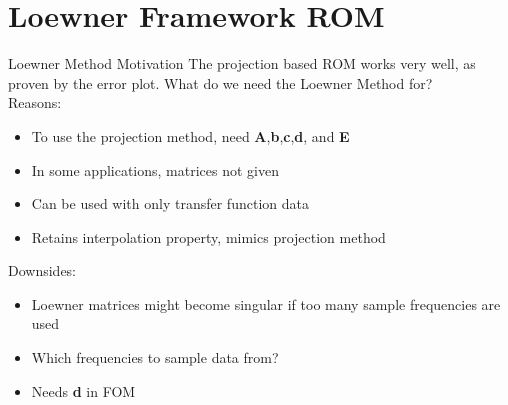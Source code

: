 \section{Loewner Framework ROM}

\begin{frame}{Loewner Method Motivation}
The projection based ROM works very well, as proven by the error plot. What do we need the Loewner Method for?\\
\bigskip
Reasons:
\begin{itemize}
    \item To use the projection method, need {\bf A},{\bf b},{\bf c},{\bf d}, and {\bf E}
    \item In some applications, matrices not given
    \item Can be used with only transfer function data
    \item Retains interpolation property, mimics projection method
\end{itemize}
\bigskip
Downsides:
\begin{itemize}
    \item Loewner matrices might become singular if too many sample frequencies are used
    \item Which frequencies to sample data from?
    \item Needs {\bf d} in FOM
\end{itemize}
    
\end{frame}

